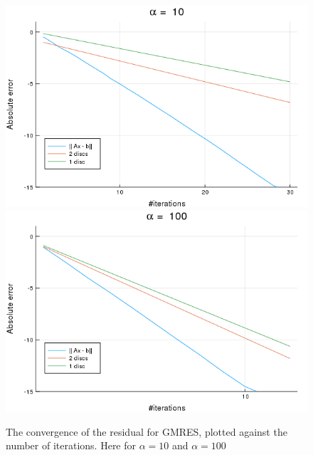 \begin{figure}[h!]
\centering
\includegraphics[scale=0.4]{../task2/images/Task2_ab_a10_conv.png}
\includegraphics[scale=0.4]{../task2/images/Task2_ab_a100_conv.png}
\caption{The convergence of the residual for GMRES, plotted against the number of iterations. Here for $\alpha=10$ and $\alpha=100$}
\label{fig:task2a_10_100}
\end{figure}


